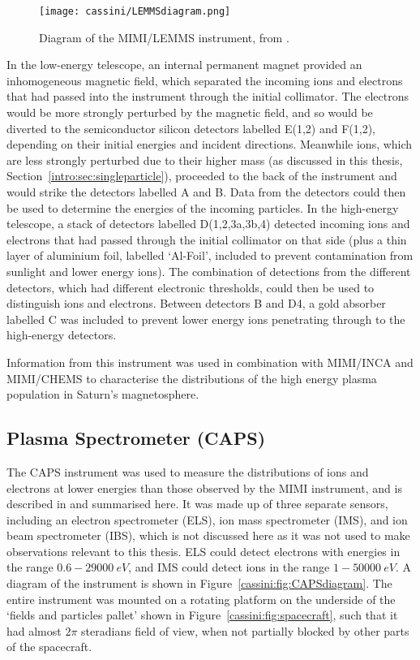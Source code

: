\begin{figure}
\centering
\noindent\texttt{[image: cassini/LEMMSdiagram.png]}
\caption[Diagram of the MIMI/LEMMS instrument.]{Diagram of the MIMI/LEMMS instrument, from \citet{krimigis2004}.}
\label{cassini:fig:LEMMSdiagram}
\end{figure}

In the low-energy telescope, an internal permanent magnet provided an inhomogeneous magnetic field, which separated the incoming ions and electrons that had passed into the instrument through the initial collimator. The electrons would be more strongly perturbed by the magnetic field, and so would be diverted to  the  semiconductor silicon detectors labelled E(1,2) and F(1,2), depending on their initial energies and incident directions. Meanwhile ions, which are  less strongly perturbed due to their higher mass  (as discussed in this thesis, Section~\ref{intro:sec:singleparticle}), proceeded to the back of the instrument and would strike the detectors labelled A and B. Data from the  detectors could then be used to determine the energies of the  incoming  particles. In the high-energy telescope, a stack of detectors labelled D(1,2,3a,3b,4) detected incoming ions and electrons that had passed through the initial collimator on that side (plus a thin layer of aluminium foil, labelled `Al-Foil', included to prevent contamination from sunlight and lower energy ions). The combination of detections from the different detectors, which had different electronic thresholds, could then be used to distinguish ions and electrons.  Between detectors B and D4,  a gold absorber labelled C was included to prevent lower energy ions penetrating through to the high-energy detectors.

Information from this instrument  was used in combination with MIMI/INCA and MIMI/CHEMS to characterise the distributions of the high energy plasma population in Saturn's magnetosphere.

\subsection{Plasma Spectrometer (CAPS)}
The CAPS instrument was used to measure the distributions of ions and electrons at lower energies than those observed by the MIMI instrument, and is described in \citet{young2004} and summarised here.  It was made up of three separate sensors, including an electron spectrometer (ELS), ion mass spectrometer (IMS), and ion beam spectrometer  (IBS), which is  not discussed here as it was not used to make observations relevant to this thesis. ELS could detect electrons with energies in the range ${0.6}{-}\SI{29000}{eV}$,  and IMS could detect ions in the range ${1}{-}\SI{50000}{eV}$. A diagram of the instrument is shown in Figure~\ref{cassini:fig:CAPSdiagram}. The entire instrument was mounted on a  rotating  platform on the underside of the `fields and particles pallet'  shown in Figure~\ref{cassini:fig:spacecraft}, such that it had almost $2\pi$ steradians field of view, when not partially blocked by  other parts of the spacecraft.

